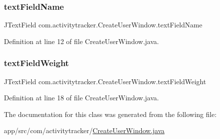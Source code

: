 \subsubsection{\texorpdfstring{text\+Field\+Name}{textFieldName}}
{\footnotesize\ttfamily J\+Text\+Field com.\+activitytracker.\+Create\+User\+Window.\+text\+Field\+Name\hspace{0.3cm}{\ttfamily [private]}}



Definition at line 12 of file Create\+User\+Window.\+java.

\mbox{\label{classcom_1_1activitytracker_1_1_create_user_window_ae84b4d977150419bfabc11fbd009392c}} 
\subsubsection{\texorpdfstring{text\+Field\+Weight}{textFieldWeight}}
{\footnotesize\ttfamily J\+Text\+Field com.\+activitytracker.\+Create\+User\+Window.\+text\+Field\+Weight\hspace{0.3cm}{\ttfamily [private]}}



Definition at line 18 of file Create\+User\+Window.\+java.



The documentation for this class was generated from the following file\+:\begin{DoxyCompactItemize}
\item 
app/src/com/activitytracker/\mbox{\hyperlink{_create_user_window_8java}{Create\+User\+Window.\+java}}\end{DoxyCompactItemize}
